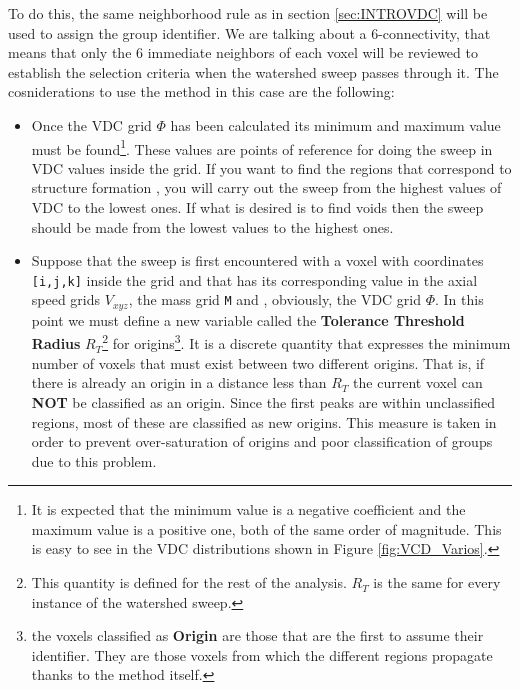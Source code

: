 To do this, the same neighborhood rule as in section \ref{sec:INTROVDC} will be used to assign the group identifier. We are talking about  a 6-connectivity, that means that only the 6 immediate neighbors of each voxel will be reviewed to establish the selection criteria when the watershed sweep passes through it. The cosniderations to use the method in this case are the following:
\begin{itemize}
    \item Once the VDC grid $\Phi$ has been calculated its minimum  and maximum value must be found\footnote{It is expected that the minimum value is a negative coefficient and the maximum value is a positive one, both of the same order of magnitude. This is easy to see in the VDC distributions shown in Figure \ref{fig:VCD_Varios}.}. These values are points of reference for doing the sweep in VDC values inside the grid. If you want to find the regions that correspond to structure formation , you will carry out the sweep from the highest values of VDC to the lowest ones. If what is desired is to find voids then the sweep should be made from the lowest values to the highest ones.
    
    \item Suppose that the sweep is first encountered with a voxel with coordinates \texttt{[i,j,k]} inside the grid and that has its corresponding value in the axial speed grids $V_{xyz}$, the mass grid \texttt{M} and , obviously, the VDC grid $\Phi$. In this point we must define a new variable called the \textbf{Tolerance Threshold Radius} $R_T$\footnote{This quantity is defined for the rest of the analysis. $R_T$ is the same for every instance of the watershed sweep.} for origins\footnote{the voxels classified as \textbf{Origin} are those that are the first to assume their identifier. They are those voxels from which the different regions propagate thanks to the method itself.}.  It is a discrete quantity that expresses the minimum number of voxels that must exist between two different origins. That is, if there is already an origin in a distance less than $R_T$ the current voxel can \textbf{NOT} be classified as an origin. Since the first peaks are within unclassified regions, most of these are classified as new origins. This measure is taken in order to prevent over-saturation of origins and poor classification of groups due to this problem.
    

\end{itemize}
